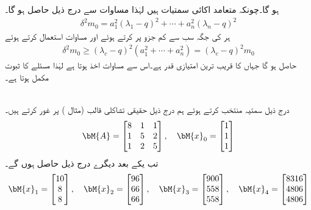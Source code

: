ہو گا۔چونکہ  متعامد اکائی سمتیات ہیں لہٰذا مساوات  سے درج ذیل حاصل ہو گا۔
\begin{align*}
\delta^2m_0=a_1^2(\lambda_1-q)^2+\cdots+a_n^2(\lambda_n-q)^2
\end{align*}
ہر  کی جگہ  سب سے  کم جزو پر کرتے ہوئے اور مساوات  استعمال کرتے ہوئے
\begin{align*}
\delta^2m_0\ge (\lambda_c-q)^2(a_1^2+\cdots+a_n^2)=(\lambda_c-q)^2m_0
\end{align*}
حاصل ہو گا جہاں  کا قریب ترین امتیازی قدر  ہے۔اس سے مساوات  اخذ ہوتا ہے لہٰذا مسئلے کا ثبوت مکمل ہوتا ہے۔

\quad {}\\
درج ذیل سمتیہ  منتخب کرتے ہوئے ہم درج ذیل حقیقی تشاکلی قالب   (مثال ) پر غور کرتے ہیں۔
\begin{align*}
\bM{A}=\begin{bmatrix} 8&1&1\\1&5&2\\1&2&5 \end{bmatrix},\quad \bM{x}_0=\begin{bmatrix}1\\1\\1  \end{bmatrix}
\end{align*}
تب یکے بعد دیگرے درج ذیل حاصل ہوں گے۔
\begin{align*}
\bM{x}_1=\begin{bmatrix}10\\8\\8 \end{bmatrix},\quad
\bM{x}_2=\begin{bmatrix} 96\\66\\66 \end{bmatrix},\quad
\bM{x}_3=\begin{bmatrix} 900\\558\\558 \end{bmatrix},\quad
\bM{x}_4=\begin{bmatrix}8316\\4806\\4806 \end{bmatrix}
\end{align*}

